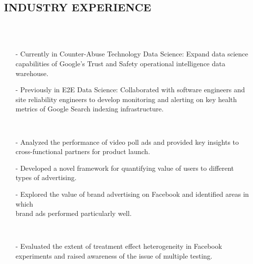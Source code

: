 \documentclass{res}
\begin{document}
\begin{resume}
\section{INDUSTRY EXPERIENCE}

     \\ 
     \\ 
            \begin{itemize}\setlength\itemsep{0em}
        \item[-] Currently in Counter-Abuse Technology Data Science: Expand data science capabilities of Google's Trust and Safety operational intelligence data warehouse.
        \item[-] Previously in E2E Data Science: Collaborated with software engineers and site reliability engineers to develop monitoring and alerting on key health metrics of Google Search indexing infrastructure.
        \end{itemize}

     \\ 
            \begin{itemize}\setlength\itemsep{0em}
        \item[-] Analyzed the performance of video poll ads and provided key insights to cross-functional partners for product launch. 
\item[-]  Developed a novel framework for quantifying value of users to different types of advertising. 
\item[-] Explored the value of brand advertising on Facebook and identified areas in which \\brand ads performed particularly well. 
        \end{itemize}

     \\ 
            \begin{itemize}\setlength\itemsep{0em}
        \item[-] Evaluated the extent of treatment effect heterogeneity in Facebook experiments and raised awareness of the issue of multiple testing.
        \end{itemize}
  

\end{resume}
\end{document}
